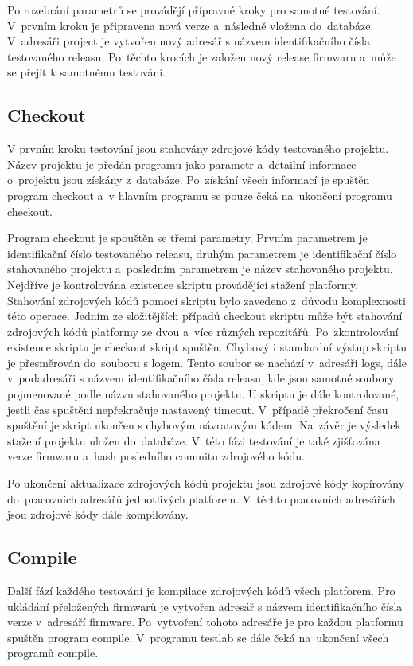Po rozebrání parametrů se provádějí přípravné kroky pro samotné testování. V~prvním kroku je připravena nová verze a~následně vložena do~databáze. V~adresáři project je vytvořen nový adresář s názvem identifikačního čísla testovaného releasu. Po~těchto krocích je založen nový release firmwaru a~může se přejít k samotnému testování.

\subsection{Checkout}
V prvním kroku testování jsou stahovány zdrojové kódy testovaného projektu. Název projektu je předán programu jako parametr a~detailní informace o~projektu jsou získány z~databáze. Po~získání všech informací je spuštěn program checkout  a~v hlavním programu se pouze čeká na~ukončení programu checkout.

Program checkout je spouštěn se třemi parametry. Prvním parametrem je identifikační číslo testovaného releasu, druhým parametrem je identifikační číslo stahovaného projektu a~posledním parametrem je název stahovaného projektu. Nejdříve je kontrolována existence skriptu provádějící stažení platformy. Stahování zdrojových kódů pomocí skriptu bylo zavedeno z~důvodu komplexnosti této operace. Jedním ze složitějších případů checkout skriptu může být stahování zdrojových kódů platformy ze dvou a~více různých repozitářů. Po~zkontrolování existence skriptu je checkout skript spuštěn. Chybový i standardní výstup skriptu je přesměrován do~souboru s logem. Tento soubor se nachází v~adresáři logs, dále v~podadresáři s názvem identifikačního čísla releasu, kde jsou samotné soubory pojmenované podle názvu stahovaného projektu. U skriptu je dále kontrolované, jestli čas spuštění nepřekračuje nastavený timeout. V~případě překročení času spuštění je skript ukončen s chybovým návratovým kódem. Na~závěr je výsledek stažení projektu uložen do~databáze. V~této fázi testování je také zjišťována verze firmwaru a~hash posledního commitu zdrojového kódu.

Po ukončení aktualizace zdrojových kódů projektu jsou zdrojové kódy kopírovány do~pracovních adresářů jednotlivých platforem. V~těchto pracovních adresářích jsou zdrojové kódy dále kompilovány.

\subsection{Compile}
Další fází každého testování je kompilace zdrojových kódů všech platforem. Pro ukládání přeložených firmwarů je vytvořen adresář s názvem identifikačního čísla verze v~adresáří firmware. Po~vytvoření tohoto adresáře je pro každou platformu spuštěn program compile. V~programu testlab se dále čeká na~ukončení všech programů compile.

